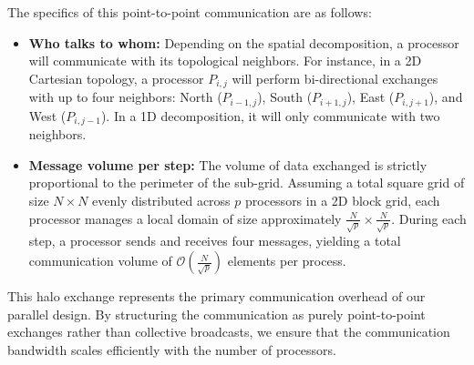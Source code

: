 The specifics of this point-to-point communication are as follows:
\begin{itemize}
    \item \textbf{Who talks to whom:} Depending on the spatial decomposition, a processor will communicate with its topological neighbors. For instance, in a 2D Cartesian topology, a processor $P_{i,j}$ will perform bi-directional exchanges with up to four neighbors: North ($P_{i-1,j}$), South ($P_{i+1,j}$), East ($P_{i,j+1}$), and West ($P_{i,j-1}$). In a 1D decomposition, it will only communicate with two neighbors.
    \item \textbf{Message volume per step:} The volume of data exchanged is strictly proportional to the perimeter of the sub-grid. Assuming a total square grid of size $N \times N$ evenly distributed across $p$ processors in a 2D block grid, each processor manages a local domain of size approximately $\frac{N}{\sqrt{p}} \times \frac{N}{\sqrt{p}}$. During each step, a processor sends and receives four messages, yielding a total communication volume of $\mathcal{O}(\frac{N}{\sqrt{p}})$ elements per process.
\end{itemize}

This halo exchange represents the primary communication overhead of our parallel design. By structuring the communication as purely point-to-point exchanges rather than collective broadcasts, we ensure that the communication bandwidth scales efficiently with the number of processors.